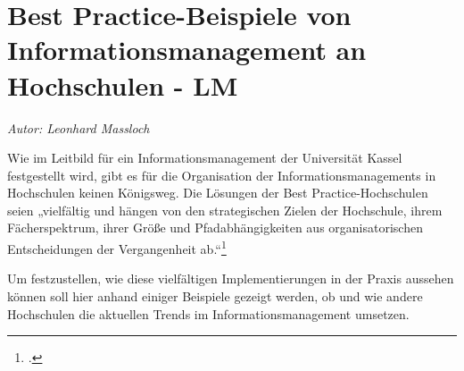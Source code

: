 \chapter{Best Practice-Beispiele von Informationsmanagement an Hochschulen - LM}
\label{chapter_best_practice_beispiele}
\textit{Autor: Leonhard Massloch}

Wie im Leitbild für ein Informationsmanagement der Universität Kassel festgestellt wird, gibt es für die Organisation der Informationsmanagements in Hochschulen keinen Königsweg. Die Lösungen der Best Practice-Hochschulen seien „vielfältig und hängen von den strategischen Zielen der Hochschule, ihrem Fächerspektrum, ihrer Größe und Pfadabhängigkeiten aus organisatorischen Entscheidungen der Vergangenheit ab.“\footcite{unikassel_leitbild_oD}

Um festzustellen, wie diese vielfältigen Implementierungen in der Praxis aussehen können soll hier anhand einiger Beispiele gezeigt werden, ob und wie andere Hochschulen die aktuellen Trends im Informationsmanagement umsetzen.



